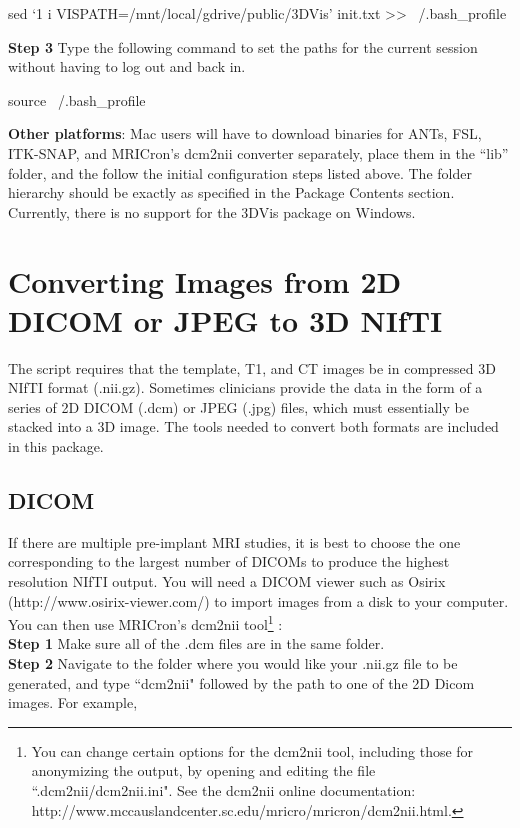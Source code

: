 \documentclass[12pt]{article}
\begin{document}
\begin{verb}
  sed `1 i VISPATH=/mnt/local/gdrive/public/3DVis' init.txt >> ~/.bash_profile
\end{verb}

\textbf{Step 3} Type the following command to set the paths for the current session without having to log out and back in. 

\begin{verb}
  source ~/.bash_profile
\end{verb}

\textbf{Other platforms}: Mac users will have to download binaries for ANTs, FSL, ITK-SNAP, and MRICron's dcm2nii converter separately, place them in the ``lib'' folder, and the follow the initial configuration steps listed above.  The folder hierarchy should be exactly as specified in the Package Contents section. Currently, there is no support for the 3DVis package on Windows.


\section{Converting Images from 2D DICOM or JPEG  to 3D NIfTI}
The script requires that the template, T1, and CT images be in compressed 3D NIfTI format (.nii.gz). Sometimes clinicians provide the data in the form of a series of 2D DICOM (.dcm) or JPEG (.jpg) files, which must essentially be stacked into a 3D image. The tools needed to convert both formats are included in this package.

\subsection*{DICOM}
If there are multiple pre-implant MRI studies, it is best to choose the one corresponding to the largest number of DICOMs to produce the highest resolution NIfTI output. You will need a DICOM viewer such as Osirix (http://www.osirix-viewer.com/) to import images from a disk to your computer. You can then use MRICron's dcm2nii tool\footnote{You can change certain options for the dcm2nii tool, including those for anonymizing the output, by opening and editing the file ``.dcm2nii/dcm2nii.ini".  See the dcm2nii online documentation: http://www.mccauslandcenter.sc.edu/mricro/mricron/dcm2nii.html.} : \\
\textbf{Step 1} Make sure all of the .dcm files are in the same folder. \\
\textbf{Step 2} Navigate to the folder where you would like your .nii.gz file to be generated, and type ``dcm2nii" followed by the path to one of the 2D Dicom images. For example, 
\end{document}
